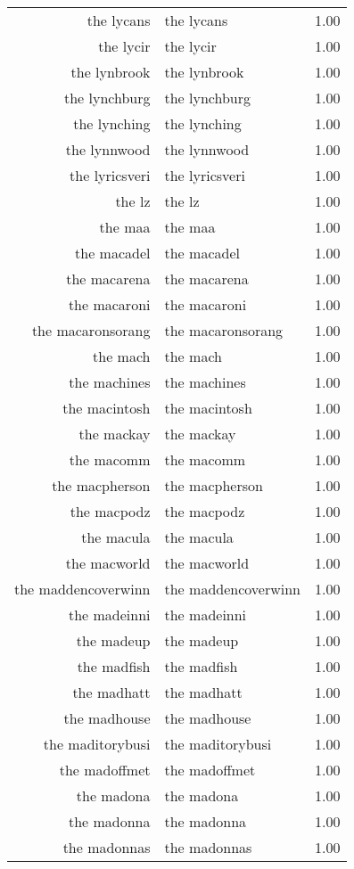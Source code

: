 \begin{table}[ht]
\begin{tabular}{rlr}
  the lycans & the lycans & 1.00 \\ 
  the lycir & the lycir & 1.00 \\ 
  the lynbrook & the lynbrook & 1.00 \\ 
  the lynchburg & the lynchburg & 1.00 \\ 
  the lynching & the lynching & 1.00 \\ 
  the lynnwood & the lynnwood & 1.00 \\ 
  the lyricsveri & the lyricsveri & 1.00 \\ 
  the lz & the lz & 1.00 \\ 
  the maa & the maa & 1.00 \\ 
  the macadel & the macadel & 1.00 \\ 
  the macarena & the macarena & 1.00 \\ 
  the macaroni & the macaroni & 1.00 \\ 
  the macaronsorang & the macaronsorang & 1.00 \\ 
  the mach & the mach & 1.00 \\ 
  the machines & the machines & 1.00 \\ 
  the macintosh & the macintosh & 1.00 \\ 
  the mackay & the mackay & 1.00 \\ 
  the macomm & the macomm & 1.00 \\ 
  the macpherson & the macpherson & 1.00 \\ 
  the macpodz & the macpodz & 1.00 \\ 
  the macula & the macula & 1.00 \\ 
  the macworld & the macworld & 1.00 \\ 
  the maddencoverwinn & the maddencoverwinn & 1.00 \\ 
  the madeinni & the madeinni & 1.00 \\ 
  the madeup & the madeup & 1.00 \\ 
  the madfish & the madfish & 1.00 \\ 
  the madhatt & the madhatt & 1.00 \\ 
  the madhouse & the madhouse & 1.00 \\ 
  the maditorybusi & the maditorybusi & 1.00 \\ 
  the madoffmet & the madoffmet & 1.00 \\ 
  the madona & the madona & 1.00 \\ 
  the madonna & the madonna & 1.00 \\ 
  the madonnas & the madonnas & 1.00 \\ 

\end{tabular}
\end{table}

